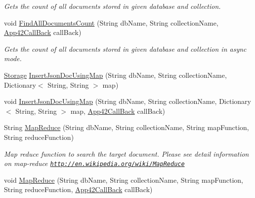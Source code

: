 \begin{DoxyCompactItemize}
\begin{DoxyCompactList}\small\item\em Gets the count of all documents stored in given database and collection. \end{DoxyCompactList}\item 
void \hyperlink{classcom_1_1shephertz_1_1app42_1_1paas_1_1sdk_1_1csharp_1_1storage_1_1_storage_service_aec77ab17330faa10168f7191674ebd7b}{Find\+All\+Documents\+Count} (String db\+Name, String collection\+Name, \hyperlink{interfacecom_1_1shephertz_1_1app42_1_1paas_1_1sdk_1_1csharp_1_1_app42_call_back}{App42\+Call\+Back} call\+Back)
\begin{DoxyCompactList}\small\item\em Gets the count of all documents stored in given database and collection in async mode. \end{DoxyCompactList}\item 
\hyperlink{classcom_1_1shephertz_1_1app42_1_1paas_1_1sdk_1_1csharp_1_1storage_1_1_storage}{Storage} \hyperlink{classcom_1_1shephertz_1_1app42_1_1paas_1_1sdk_1_1csharp_1_1storage_1_1_storage_service_a69a77b81a586c07a0a73fcb95627372e}{Insert\+Json\+Doc\+Using\+Map} (String db\+Name, String collection\+Name, Dictionary$<$ String, String $>$ map)
\item 
void \hyperlink{classcom_1_1shephertz_1_1app42_1_1paas_1_1sdk_1_1csharp_1_1storage_1_1_storage_service_a9b04d1e6ebb9e2f8b399a2b61bb24364}{Insert\+Json\+Doc\+Using\+Map} (String db\+Name, String collection\+Name, Dictionary$<$ String, String $>$ map, \hyperlink{interfacecom_1_1shephertz_1_1app42_1_1paas_1_1sdk_1_1csharp_1_1_app42_call_back}{App42\+Call\+Back} call\+Back)
\item 
String \hyperlink{classcom_1_1shephertz_1_1app42_1_1paas_1_1sdk_1_1csharp_1_1storage_1_1_storage_service_a1757ecae4a825ae4c919d7e8dbdcbb9f}{Map\+Reduce} (String db\+Name, String collection\+Name, String map\+Function, String reduce\+Function)
\begin{DoxyCompactList}\small\item\em Map reduce function to search the target document. Please see detail information on map-\/reduce \href{http://en.wikipedia.org/wiki/MapReduce}{\tt http\+://en.\+wikipedia.\+org/wiki/\+Map\+Reduce} \end{DoxyCompactList}\item 
void \hyperlink{classcom_1_1shephertz_1_1app42_1_1paas_1_1sdk_1_1csharp_1_1storage_1_1_storage_service_acc2ec0ea7f0e96c1032657a3084c340c}{Map\+Reduce} (String db\+Name, String collection\+Name, String map\+Function, String reduce\+Function, \hyperlink{interfacecom_1_1shephertz_1_1app42_1_1paas_1_1sdk_1_1csharp_1_1_app42_call_back}{App42\+Call\+Back} call\+Back)

\end{DoxyCompactItemize}
